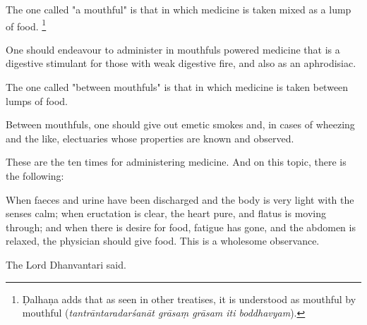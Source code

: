 \begin{translation}
	\item[102]
	The one called "a mouthful" is that in which medicine is taken mixed as a lump of food.%
	\footnote{Ḍalhaṇa adds that as seen in other treatises, it is understood as mouthful by mouthful (\emph{tantrāntaradarśanāt grāsaṃ grāsam iti boddhavyam}).}

	\item[103]
	One should endeavour to administer in mouthfuls powered medicine that is a digestive stimulant %
	for those with weak digestive fire,
	and also as an aphrodisiac.

	\item[104]
	The one called "between mouthfuls" is that in which medicine is taken between lumps of food.

	\item[105]
	Between mouthfuls, %
	one should give out %
	emetic smokes %
	and, in cases of wheezing and the like, %
	electuaries %
	whose properties are known and observed. %

	\item[106]
	These are the ten times for administering medicine. And on this topic, there is the following:

	\item[107]
	When faeces and urine have been discharged %
	and the body is very light with the senses calm; %
	when eructation is clear, the heart pure, and flatus is moving through;
	and when there is desire for food, %
	fatigue has gone, %
	and the abdomen is relaxed,
	the physician should give food. %
	This is a wholesome observance. %

	\item[108]
	The Lord Dhanvantari said.
\end{translation}
